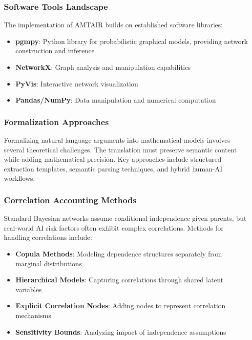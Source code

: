 \documentclass[
  11pt,
  letterpaper,
]{book}
\providecommand{\tightlist}{%
  \setlength{\itemsep}{0pt}\setlength{\parskip}{0pt}}
\begin{document}
\subsubsection{Software Tools Landscape}\label{sec-software-tools}

The implementation of AMTAIR builds on established software libraries:

\begin{itemize}
\tightlist
\item
  \textbf{pgmpy}: Python library for probabilistic graphical models,
  providing network construction and inference
\item
  \textbf{NetworkX}: Graph analysis and manipulation capabilities
\item
  \textbf{PyVis}: Interactive network visualization
\item
  \textbf{Pandas/NumPy}: Data manipulation and numerical computation
\end{itemize}

\subsubsection{Formalization Approaches}\label{sec-formalization}

Formalizing natural language arguments into mathematical models involves
several theoretical challenges. The translation must preserve semantic
content while adding mathematical precision. Key approaches include
structured extraction templates, semantic parsing techniques, and hybrid
human-AI workflows.

\subsubsection{Correlation Accounting
Methods}\label{sec-correlation-methods}

Standard Bayesian networks assume conditional independence given
parents, but real-world AI risk factors often exhibit complex
correlations. Methods for handling correlations include:

\begin{itemize}
\tightlist
\item
  \textbf{Copula Methods}: Modeling dependence structures separately
  from marginal distributions
\item
  \textbf{Hierarchical Models}: Capturing correlations through shared
  latent variables
\item
  \textbf{Explicit Correlation Nodes}: Adding nodes to represent
  correlation mechanisms
\item
  \textbf{Sensitivity Bounds}: Analyzing impact of independence
  assumptions
\end{itemize}
\end{document}
